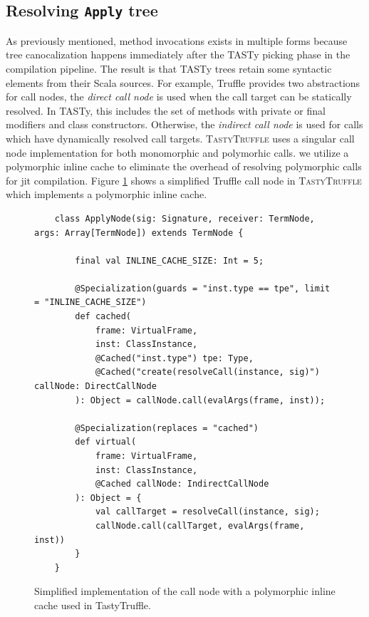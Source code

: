 
\subsection{Resolving \texttt{Apply} tree}

As previously mentioned, method invocations exists in multiple forms because tree canocalization happens immediately after the TASTy picking phase in the compilation pipeline.
The result is that TASTy trees retain some syntactic elements from their Scala sources. 
For example, Truffle provides two abstractions for call nodes, the \textit{direct call node} is used when the call target can be statically resolved. 
In TASTy, this includes the set of methods with private or final modifiers\cite{java:lang-spec} and class constructors. 
Otherwise, the \textit{indirect call node} is used for calls which have dynamically resolved call targets. 
\textsc{TastyTruffle} uses a singular call node implementation for both monomorphic and polymorhic calls. 
we utilize a polymorphic inline cache\cite{self:polymorphic-inline-caches} to eliminate the overhead of resolving polymorphic calls for \acrshort{jit} compilation. 
Figure \ref{implementation:poly-cache-call-node} shows a simplified Truffle call node in \textsc{TastyTruffle} which implements a polymorphic inline cache.

\begin{figure}[!htb]
	\begin{verbatim}
	class ApplyNode(sig: Signature, receiver: TermNode, args: Array[TermNode]) extends TermNode {
		
		final val INLINE_CACHE_SIZE: Int = 5;
		
		@Specialization(guards = "inst.type == tpe", limit = "INLINE_CACHE_SIZE")
		def cached(
			frame: VirtualFrame,
			inst: ClassInstance,
			@Cached("inst.type") tpe: Type,
			@Cached("create(resolveCall(instance, sig)") callNode: DirectCallNode
		): Object = callNode.call(evalArgs(frame, inst));
		
		@Specialization(replaces = "cached")
		def virtual(
			frame: VirtualFrame,
			inst: ClassInstance,
			@Cached callNode: IndirectCallNode
		): Object = {
			val callTarget = resolveCall(instance, sig);
			callNode.call(callTarget, evalArgs(frame, inst))
		}
	}
	\end{verbatim}
	\caption{Simplified implementation of the call node with a polymorphic inline cache used in TastyTruffle.}
	\label{implementation:poly-cache-call-node}
\end{figure}

